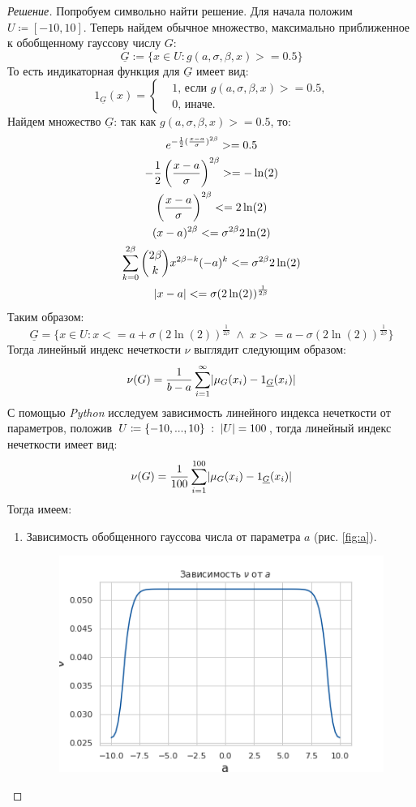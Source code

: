 \documentclass[11pt,a4paper,oneside]{article}
\newenvironment{solution}{
	\begin{proof}[Решение]
		\vspace{-8px}
		\setlength{\parskip}{4px}
		\setlength{\parindent}{0px}
	}{
	\end{proof}
}
\DeclarePairedDelimiter\abs{\lvert}{\rvert}%
\begin{document}
	\begin{solution}
		Попробуем символьно найти решение. Для начала положим $U \coloneqq [-10,10]$. Теперь найдем обычное множество, максимально приближенное к обобщенному гауссову числу $G$:
		\[
			\underline{G} := \{ x \in U: g(a,\sigma,\beta,x) >= 0.5 \}
		\]
		То есть индикаторная функция для $\underline{G}$ имеет вид:
		\[
			1_{\underline{G}}(x) = \left\{\begin{aligned}
												&1\text{, если $g(a,\sigma,\beta,x) >= 0.5$,}\\
												&0\text{, иначе.}
											\end{aligned}
									\right.
		\]
		Найдем множество $\underline{G}$: так как $ g(a,\sigma,\beta,x) >= 0.5$, то:
		\begin{gather*}
			e^{-\frac{1}{2}( \frac{x-a}{\sigma})^{2\beta}} >= 0.5 \\
			-\frac{1}{2} \left( \frac{x-a}{\sigma}\right)^{2\beta} >= -\ln(2) \\
			\left(\frac{x-a}{\sigma}\right)^{2\beta} <= 2\ln(2) \\
			(x-a)^{2\beta} <= \sigma^{2\beta}2\ln(2) \\
			\sum_{k=0}^{2\beta} {2\beta\choose k} x^{2\beta-k}(-a)^k <= \sigma^{2\beta}2\ln(2) \\
			\abs{x-a} <= \sigma({2\ln(2)})^\frac{1}{2\beta}
		\end{gather*}
		Таким образом: \[
		\underline{G} = \{ x \in U : x <= a + \sigma({2\ln(2)})^\frac{1}{2\beta} \; \land\;x >= a - \sigma({2\ln(2)})^\frac{1}{2\beta} \}
		\]
		Тогда линейный индекс нечеткости $\nu$ выглядит следующим образом:
			\[
				\nu(G) = \frac{1}{b-a} \sum_{i=1}^{\infty} \abs{\mu_G(x_i) - 1_{\underline{G}}(x_i)}
			\]
		С помощью {\it Python} исследуем зависимость линейного индекса нечеткости от параметров, положив $U \coloneqq \{-10, ..., 10\} \; : \; \abs{U} = 100$, тогда линейный индекс нечеткости имеет вид:
		\[
		\nu(G) = \frac{1}{100} \sum_{i=1}^{100} \abs{\mu_G(x_i) - 1_{\underline{G}}(x_i)}
		\]
		Тогда имеем:
		\begin{enumerate}
			\item Зависимость обобщенного гауссова числа от параметра $a$ (рис. \ref{fig:a}).
			\begin{figure}[!hbtp]
				\centering
				\includegraphics[width=\linewidth]{2ndtaskwitha.png}

\end{figure}
\end{enumerate}
\end{solution}
\end{document}
